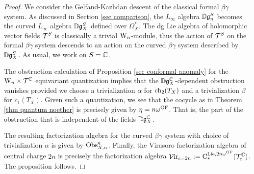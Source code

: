 \begin{proof} We consider the Gelfand-Kazhdan descent of the classical formal $\beta\gamma$ system. As  discussed in Section \ref{sec comparison}, the $L_\infty$ algebra $\mathbb D \mathfrak g_n^S$ becomes the curved $L_\infty$ algebra $\mathbb D \mathfrak g_X^S$ defined over $\Omega^*_X$. The dg Lie algebra of holomorphic vector fields $\mathcal T^S$ is classically a trivial ${{\rm W}_n}$-module, thus the action of $\mathcal T^S$ on the formal $\beta\gamma$ system descends to an action on the curved $\beta\gamma$ system described by $\mathbb D \mathfrak g_X^S$. As usual, we work on $S = \mathbb C$. 

The obstruction calculation of Proposition \ref{sec conformal anomaly} for the ${{\rm W}_n} \times \mathcal T^\mathbb C$ equivariant quantization implies that the $\mathbb D \mathfrak g_X^\mathbb C$-dependent obstruction vanishes provided we choose a trivialization $\alpha$ for ${\rm ch}_2(T_X)$ and a trivialization $\beta$ for $c_1(T_X)$. Given such a quantization, we see that the cocycle as in Theorem \ref{thm quantum noether} is precisely given by $\eta = n \omega^{{\rm GF}}$. That is, the part of the obstruction that is independent of the fields $\mathbb D \mathfrak g_X^\mathbb C$. 

The resulting factorization algebra for the curved $\beta\gamma$ system with choice of trivialization $\alpha$ is given by ${\rm Obs}^{\rm q}_{X,\alpha}$. Finally, the Virasoro factorization algebra of central charge $2n$ is precisely the factorization algebra $\mathcal{V}{\rm ir}_{c=2n} := {\rm C}^{{\rm Lie}, 2 n \omega^{{\rm GF}}}_* (\mathcal T^\mathbb C_c)$. The proposition follows.
\end{proof}


